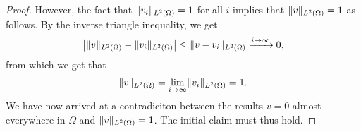 \documentclass[english, 12pt, a4paper, sci, utf8, a-2b, online]{aaltothesis}
\theoremstyle{definition}
\theoremstyle{plain}
\DeclarePairedDelimiter\abs{\lvert}{\rvert}
\DeclarePairedDelimiter\norm{\lVert}{\rVert}
\numberwithin{equation}{section}
\begin{document}
\begin{proof}
    However, the fact that $\norm{v_i}_{L^2(\Omega)} = 1$ for all $i$
    implies that $\norm{v}_{L^2(\Omega)} = 1$ as follows. By the inverse
    triangle inequality, we get
    \begin{equation*}
        \abs*{\norm{v}_{L^2(\Omega)} - \norm{v_i}_{L^2(\Omega)}}
        \leq \norm{v - v_i}_{L^2(\Omega)}
        \xrightarrow[]{i \to \infty} 0,
    \end{equation*}
    from which we get that
    \begin{equation*}
        \norm{v}_{L^2(\Omega)}
        = \lim_{i \to \infty} \norm{v_i}_{L^2(\Omega)}
        = 1.
    \end{equation*}
    We have now arrived at a contradiciton between the results $v = 0$
    almost everywhere in $\Omega$ and $\norm{v}_{L^2(\Omega)} = 1$.
    The initial claim must thus hold.
\end{proof}
\end{document}
